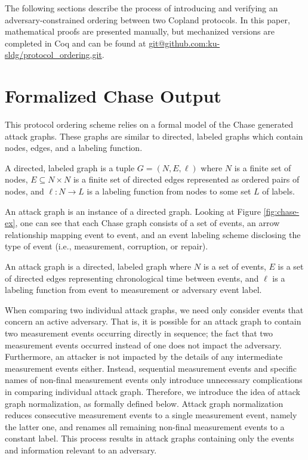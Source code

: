 \documentclass[runningheads]{llncs}
\theoremstyle{definition}
\begin{document}
The following sections describe the process of introducing and verifying an adversary-constrained ordering between two Copland protocols. In this paper, mathematical proofs are presented manually, but mechanized versions are completed in Coq and can be found at \url{git@github.com:ku-sldg/protocol_ordering.git}.


\section{Formalized Chase Output}

This protocol ordering scheme relies on a formal model of the Chase generated attack graphs. These graphs are similar to directed, labeled graphs which contain nodes, edges, and a labeling function. 

\begin{definition}[Graph]
    A directed, labeled graph is a tuple $G = (N, E, \ell)$ where $N$ is a finite set of nodes, $E \subseteq N \times N$ is a finite set of directed edges represented as ordered pairs of nodes, and $\ell : N \rightarrow L$ is a labeling function from nodes to some set $L$ of labels. 
\end{definition}
 
An attack graph is an instance of a directed graph. Looking at Figure \ref{fig:chase-ex}, one can see that each Chase graph consists of a set of events, an arrow relationship mapping event to event, and an event labeling scheme disclosing the type of event (i.e., measurement, corruption, or repair).

\begin{definition}
    An attack graph is a directed, labeled graph where $N$ is a set of events, $E$ is a set of directed edges representing chronological time between events, and $\ell$ is a labeling function from event to measurement or adversary event label.
\end{definition}

When comparing two individual attack graphs, we need only consider events that concern an active adversary. That is, it is possible for an attack graph to contain two measurement events occurring directly in sequence; the fact that two measurement events occurred instead of one does not impact the adversary. Furthermore, an attacker is not impacted by the details of any intermediate measurement events either. Instead, sequential measurement events and specific names of non-final measurement events only introduce unnecessary complications in comparing individual attack graph. Therefore, we introduce the idea of attack graph normalization, as formally defined below. Attack graph normalization reduces consecutive measurement events to a single measurement event, namely the latter one, and renames all remaining non-final measurement events to a constant label. This process results in attack graphs containing only the events and information relevant to an adversary. 
\end{document}
